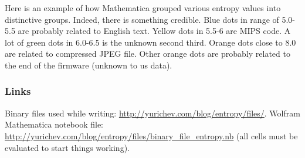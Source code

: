 \begin{figure}[H]
\centering
{}
\end{figure}

Here is an example of how Mathematica grouped various entropy values into distinctive groups.
Indeed, there is something credible. Blue dots in range of 5.0-5.5 are probably related to English text.
Yellow dots in 5.5-6 are MIPS code. A lot of green dots in 6.0-6.5 is the unknown second third.
Orange dots close to 8.0 are related to compressed JPEG file.
Other orange dots are probably related to the end of the firmware (unknown to us data).

\subsubsection{Links}

Binary files used while writing: \url{http://yurichev.com/blog/entropy/files/}.
Wolfram Mathematica notebook file: \url{http://yurichev.com/blog/entropy/files/binary_file_entropy.nb}
(all cells must be evaluated to start things working).

